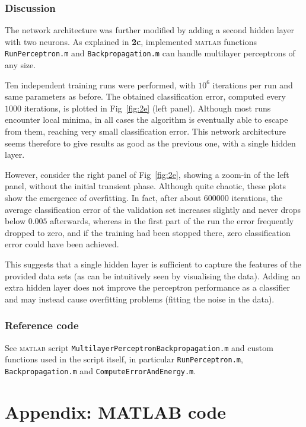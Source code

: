 \documentclass[12pt,titlepage]{article}
\begin{document}
\subsubsection*{Discussion}

The network architecture was further modified by adding a second hidden layer with two neurons. As explained in \textbf{2c}, implemented \textsc{matlab} functions \verb!RunPerceptron.m! and \verb!Backpropagation.m! can handle multilayer perceptrons of any size. 
 
Ten independent training runs were performed, with $10^6$ iterations per run and same parameters as before. The obtained classification error, computed every $1000$ iterations, is plotted in Fig~\ref{fig:2e} (left panel). Although most runs encounter local minima, in all cases the algorithm is eventually able to escape from them, reaching very small classification error. This network architecture seems therefore to give results as good as the previous one, with a single hidden layer.
 
However, consider the right panel of Fig~\ref{fig:2e}, showing a zoom-in of the left panel, without the initial transient phase. Although quite chaotic, these plots show the emergence of overfitting. In fact, after about $600000$ iterations, the average classification error of the validation set increases slightly and never drops below $0.005$ afterwards, whereas in the first part of the run the error frequently dropped to zero, and if the training had been stopped there, zero classification error could have been achieved.

This suggests that a single hidden layer is sufficient to capture the features of the provided data sets (as can be intuitively seen by visualising the data). Adding an extra hidden layer does not improve the perceptron performance as a classifier and may instead cause overfitting problems (fitting the noise in the data).

\subsubsection*{Reference code}
\vspace*{-0.2cm}
See \textsc{matlab} script \verb!MultilayerPerceptronBackpropagation.m! and custom functions used in the script itself, in particular \verb!RunPerceptron.m!, \verb!Backpropagation.m! and \verb!ComputeErrorAndEnergy.m!.

\clearpage


\appendix
\section*{Appendix: MATLAB code}
\end{document}
